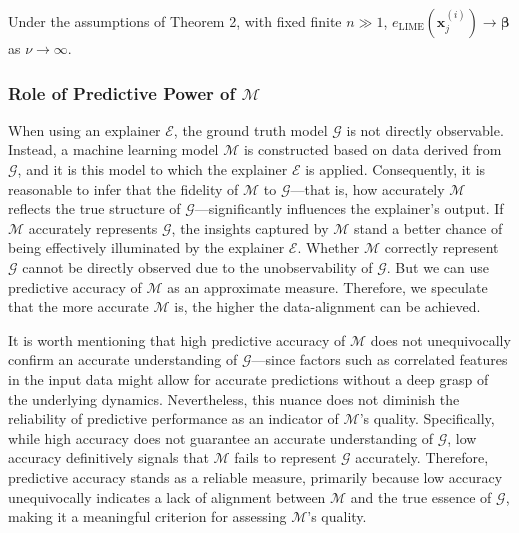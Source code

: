 \documentclass[mnsc,blindrev]{informs3}
\begin{document}
            \begin{corollary}
                Under the assumptions of Theorem 2, with fixed finite $n \gg 1$, $e_{\text{LIME}}(\mathbf{x}^{(i)}_j) \rightarrow \boldsymbol{\beta}$ as $\nu\rightarrow \infty$. 
            \end{corollary}

    \subsubsection{Role of Predictive Power of $\mathcal{M}$}
        \label{sec:role_of_predictive_power}
           When using an explainer $\mathcal{E}$, the ground truth model $\mathcal{G}$ is not directly observable. Instead, a machine learning model $\mathcal{M}$ is constructed based on data derived from $\mathcal{G}$, and it is this model to which the explainer $\mathcal{E}$ is applied. Consequently, it is reasonable to infer that the fidelity of $\mathcal{M}$ to $\mathcal{G}$—that is, how accurately $\mathcal{M}$ reflects the true structure of $\mathcal{G}$—significantly influences the explainer's output. If $\mathcal{M}$ accurately represents $\mathcal{G}$, the insights captured by $\mathcal{M}$ stand a better chance of being effectively illuminated by the explainer $\mathcal{E}$. Whether $\mathcal{M}$ correctly represent $\mathcal{G}$ cannot be directly observed due to the unobservability of $\mathcal{G}$. But we can use predictive accuracy of $\mathcal{M}$ as an approximate measure. Therefore, we speculate that the more accurate $\mathcal{M}$ is, the higher the data-alignment can be achieved. 

           It is worth mentioning that high predictive accuracy of $\mathcal{M}$ does not unequivocally confirm an accurate understanding of $\mathcal{G}$—since factors such as correlated features in the input data might allow for accurate predictions without a deep grasp of the underlying dynamics. Nevertheless, this nuance does not diminish the reliability of predictive performance as an indicator of $\mathcal{M}$'s quality. Specifically, while high accuracy does not guarantee an accurate understanding of $\mathcal{G}$, low accuracy definitively signals that $\mathcal{M}$ fails to represent $\mathcal{G}$ accurately. Therefore, predictive accuracy stands as a reliable measure, primarily because low accuracy unequivocally indicates a lack of alignment between $\mathcal{M}$ and the true essence of $\mathcal{G}$, making it a meaningful criterion for assessing $\mathcal{M}$'s quality.
\end{document}
